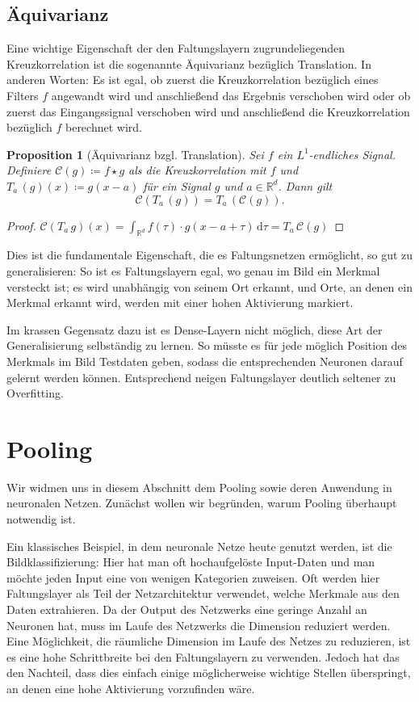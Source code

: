 \documentclass[paper=a4, 	%
		fontsize=11pt,
		abstract=true, 	%
		headsepline, 	%
		notitlepage	%
		]{scrartcl}
\newtheorem{proposition}[theorem]{Proposition}
\theoremstyle{definition}
\newcommand{\R}{\mathbb{R}}
\newcommand{\diff}{\,\textrm{d}}
\newcommand{\transl}[2]{T_{#1}\, #2}
\begin{document}
\subsection{Äquivarianz}
    
Eine wichtige Eigenschaft der den Faltungslayern zugrundeliegenden Kreuzkorrelation ist die sogenannte Äquivarianz bezüglich Translation.
In anderen Worten: Es ist egal, ob zuerst die Kreuzkorrelation bezüglich eines Filters $f$ angewandt wird und anschließend das Ergebnis verschoben wird oder ob zuerst das Eingangssignal verschoben wird und anschließend die Kreuzkorrelation bezüglich $f$ berechnet wird.

\begin{proposition}[Äquivarianz bzgl. Translation]
    Sei $f$ ein $L^1$-endliches Signal.
    Definiere $\mathcal{C}(g)\coloneqq f\star g$ als die Kreuzkorrelation mit $f$ und $\transl{a}{(g)}(x) \coloneqq g(x - a)$ für ein Signal $g$ und $a\in\R^d$.
    Dann gilt \[ \mathcal{C}(\transl{a}{(g)}) = \transl{a}{(\mathcal{C}(g))}. \]
\end{proposition}
\begin{proof}
    $\mathcal{C}(T_a\, g)(x) = \int_{\R^d} f(\tau) \cdot g(x - a + \tau) \diff \tau = \transl{a}{\mathcal{C}(g)}$
\end{proof}

Dies ist die fundamentale Eigenschaft, die es Faltungsnetzen ermöglicht, so gut zu generalisieren:
So ist es Faltungslayern egal, wo genau im Bild ein Merkmal versteckt ist; es wird unabhängig von seinem Ort erkannt, und Orte, an denen ein Merkmal erkannt wird, werden mit einer hohen Aktivierung markiert.

Im krassen Gegensatz dazu ist es Dense-Layern nicht möglich, diese Art der Generalisierung selbständig zu lernen.
So müsste es für jede möglich Position des Merkmals im Bild Testdaten geben, sodass die entsprechenden Neuronen darauf gelernt werden können.
Entsprechend neigen Faltungslayer deutlich seltener zu Overfitting. 

\section{Pooling}

Wir widmen uns in diesem Abschnitt dem Pooling sowie deren Anwendung in neuronalen Netzen.
Zunächst wollen wir begründen, warum Pooling überhaupt notwendig ist.

Ein klassisches Beispiel, in dem neuronale Netze heute genutzt werden, ist die Bildklassifizierung:
Hier hat man oft hochaufgelöste Input-Daten und man möchte jeden Input eine von wenigen Kategorien zuweisen.
Oft werden hier Faltungslayer als Teil der Netzarchitektur verwendet, welche Merkmale aus den Daten extrahieren.
Da der Output des Netzwerks eine geringe Anzahl an Neuronen hat, muss im Laufe des Netzwerks die Dimension reduziert werden.
Eine Möglichkeit, die räumliche Dimension im Laufe des Netzes zu reduzieren, ist es eine hohe Schrittbreite bei den Faltungslayern zu verwenden.
Jedoch hat das den Nachteil, dass dies einfach einige möglicherweise wichtige Stellen überspringt, an denen eine hohe Aktivierung vorzufinden wäre.
\end{document}
